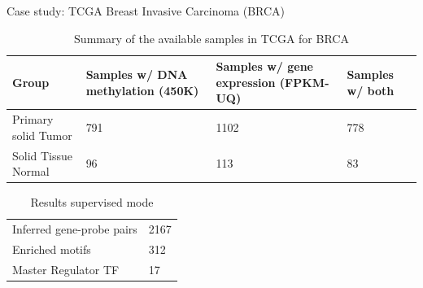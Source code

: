 \documentclass[slidestop,compress,11pt,xcolor=dvipsnames]{beamer}
\begin{document}
\begin{frame}{Case study: TCGA Breast Invasive Carcinoma (BRCA)}
 \begin{table}[ht!]
  \centering
  \caption{Summary of the available samples in TCGA for BRCA}
  \scriptsize

  \begin{tabular}{p{2.3cm}p{2.4cm}p{2.4cm}p{1cm}}
   \toprule
   Group               & Samples w/ DNA methylation (450K) & Samples w/ gene expression (FPKM-UQ) & Samples w/ both \\ \midrule
   Primary solid Tumor & 791                               & 1102                                 & 778             \\
   Solid Tissue Normal & 96                                & 113                                  & 83              \\
   \bottomrule
  \end{tabular}
 \end{table}

 \begin{table}[ht!]
  \centering
  \caption{Results supervised mode}
  \scriptsize

  \begin{tabular}{p{2.8cm}p{2.4cm}}
   \toprule
   Inferred gene-probe pairs & 2167 \\
   Enriched motifs           & 312  \\
   Master Regulator TF      & 17   \\
   \bottomrule
  \end{tabular}
 \end{table}
\end{frame}


\end{document}
